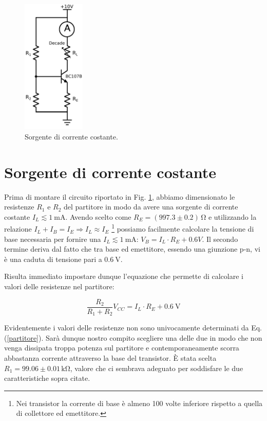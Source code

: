 \begin{figure}
	\includegraphics[width=30mm]{cc1.pdf}
	\caption{Sorgente di corrente costante.}
	\label{fig:cc1}
\end{figure}

\section{Sorgente di corrente costante}
Prima di montare il circuito riportato in Fig. \ref{fig:cc1}, abbiamo dimensionato le resistenze $R_1$ e $R_2$ del partitore in modo da avere una sorgente di corrente costante $I_L \lesssim \SI{1}{\milli\ampere}$.
Avendo scelto come $R_E=(997.3 \pm 0.2)\,\si{\ohm}$ e utilizzando la relazione $I_L+I_B=I_E \Rightarrow I_L \approx I_E$ \footnote{Nei transistor la corrente di base è almeno 100 volte inferiore rispetto a quella di collettore ed emettitore.} possiamo facilmente calcolare la tensione di base necessaria per fornire una $I_L \lesssim \SI{1}{\milli\ampere}$: $V_B=I_L \cdot R_E + 0.6V$.
Il secondo termine deriva dal fatto che tra base ed emettitore, essendo una giunzione p-n, vi è una caduta di tensione pari a $\SI{0.6}{\volt}$.

Risulta immediato impostare dunque l'equazione che permette di calcolare i valori delle resistenze nel partitore:

\begin{equation}
\frac{R_2}{R_1+R_2} V_{CC}=I_L \cdot R_E + \SI{0.6}{\volt}
\label{partitore}
\end{equation}

Evidentemente i valori delle resistenze non sono univocamente determinati da Eq. (\ref{partitore}).
Sarà dunque nostro compito scegliere una delle due in modo che non venga dissipata troppa potenza sul partitore e contemporaneamente scorra abbastanza corrente attraverso la base del transistor.
È stata scelta $R_1=99.06 \pm 0.01 \,\si{\kilo\ohm}$, valore che ci sembrava adeguato per soddisfare le due caratteristiche sopra citate.


